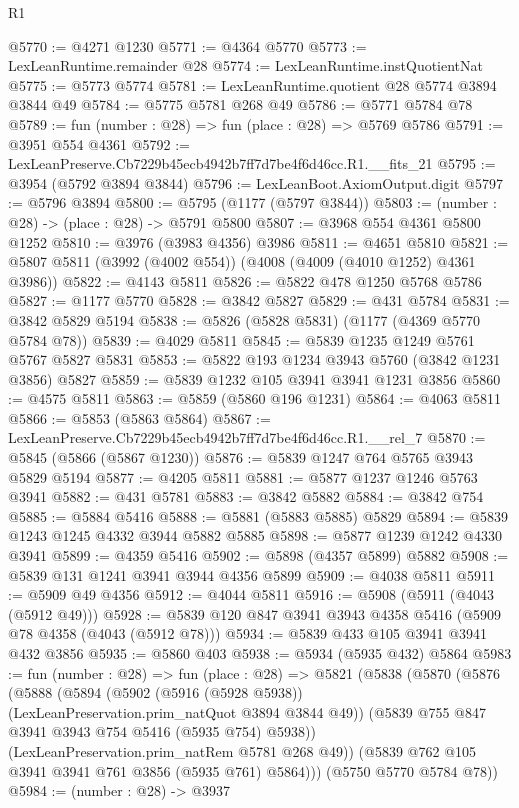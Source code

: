 \begin{lexlean}{R1}
\begin{coremodule}
@5770 := @4271 @1230
@5771 := @4364 @5770
@5773 := LexLeanRuntime.remainder @28
@5774 := LexLeanRuntime.instQuotientNat
@5775 := @5773 @5774
@5781 := LexLeanRuntime.quotient @28 @5774 @3894 @3844 @49
@5784 := @5775 @5781 @268 @49
@5786 := @5771 @5784 @78
@5789 := fun (number : @28) => fun (place : @28) => @5769 @5786
@5791 := @3951 @554 @4361
@5792 := LexLeanPreserve.Cb7229b45ecb4942b7ff7d7be4f6d46cc.R1.__fits_21
@5795 := @3954 (@5792 @3894 @3844)
@5796 := LexLeanBoot.AxiomOutput.digit
@5797 := @5796 @3894
@5800 := @5795 (@1177 (@5797 @3844))
@5803 := (number : @28) -> (place : @28) -> @5791 @5800
@5807 := @3968 @554 @4361 @5800 @1252
@5810 := @3976 (@3983 @4356) @3986
@5811 := @4651 @5810
@5821 := @5807 @5811 (@3992 (@4002 @554)) (@4008 (@4009 (@4010 @1252) @4361 @3986))
@5822 := @4143 @5811
@5826 := @5822 @478 @1250 @5768 @5786
@5827 := @1177 @5770
@5828 := @3842 @5827
@5829 := @431 @5784
@5831 := @3842 @5829 @5194
@5838 := @5826 (@5828 @5831) (@1177 (@4369 @5770 @5784 @78))
@5839 := @4029 @5811
@5845 := @5839 @1235 @1249 @5761 @5767 @5827 @5831
@5853 := @5822 @193 @1234 @3943 @5760 (@3842 @1231 @3856) @5827
@5859 := @5839 @1232 @105 @3941 @3941 @1231 @3856
@5860 := @4575 @5811
@5863 := @5859 (@5860 @196 @1231)
@5864 := @4063 @5811
@5866 := @5853 (@5863 @5864)
@5867 := LexLeanPreserve.Cb7229b45ecb4942b7ff7d7be4f6d46cc.R1.__rel_7
@5870 := @5845 (@5866 (@5867 @1230))
@5876 := @5839 @1247 @764 @5765 @3943 @5829 @5194
@5877 := @4205 @5811
@5881 := @5877 @1237 @1246 @5763 @3941
@5882 := @431 @5781
@5883 := @3842 @5882
@5884 := @3842 @754
@5885 := @5884 @5416
@5888 := @5881 (@5883 @5885) @5829
@5894 := @5839 @1243 @1245 @4332 @3944 @5882 @5885
@5898 := @5877 @1239 @1242 @4330 @3941
@5899 := @4359 @5416
@5902 := @5898 (@4357 @5899) @5882
@5908 := @5839 @131 @1241 @3941 @3944 @4356 @5899
@5909 := @4038 @5811
@5911 := @5909 @49 @4356
@5912 := @4044 @5811
@5916 := @5908 (@5911 (@4043 (@5912 @49)))
@5928 := @5839 @120 @847 @3941 @3943 @4358 @5416 (@5909 @78 @4358 (@4043 (@5912 @78)))
@5934 := @5839 @433 @105 @3941 @3941 @432 @3856
@5935 := @5860 @403
@5938 := @5934 (@5935 @432) @5864
@5983 := fun (number : @28) =>
  fun (place : @28) =>
  @5821
    (@5838
      (@5870
        (@5876
          (@5888
            (@5894
              (@5902 (@5916 (@5928 @5938)) (LexLeanPreservation.prim_natQuot @3894 @3844 @49))
              (@5839 @755 @847 @3941 @3943 @754 @5416 (@5935 @754) @5938))
            (LexLeanPreservation.prim_natRem @5781 @268 @49))
          (@5839 @762 @105 @3941 @3941 @761 @3856 (@5935 @761) @5864)))
      (@5750 @5770 @5784 @78))
@5984 := (number : @28) -> @3937

\end{coremodule}
\end{lexlean}
